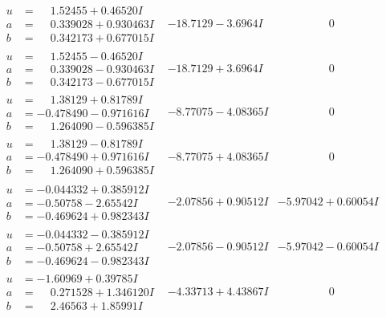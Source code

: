 \documentclass[1p]{elsarticle_modified}
\theoremstyle{definition}
\begin{document}
$$\begin{array}{c|c|c}
\begin{aligned}
u &= \phantom{-}1.52455 + 0.46520 I \\
a &= \phantom{-}0.339028 + 0.930463 I \\
b &= \phantom{-}0.342173 + 0.677015 I\end{aligned}
 & -18.7129 - 3.6964 I & \phantom{-0.000000 } 0 \\ \hline\begin{aligned}
u &= \phantom{-}1.52455 - 0.46520 I \\
a &= \phantom{-}0.339028 - 0.930463 I \\
b &= \phantom{-}0.342173 - 0.677015 I\end{aligned}
 & -18.7129 + 3.6964 I & \phantom{-0.000000 } 0 \\ \hline\begin{aligned}
u &= \phantom{-}1.38129 + 0.81789 I \\
a &= -0.478490 - 0.971616 I \\
b &= \phantom{-}1.264090 - 0.596385 I\end{aligned}
 & -8.77075 - 4.08365 I & \phantom{-0.000000 } 0 \\ \hline\begin{aligned}
u &= \phantom{-}1.38129 - 0.81789 I \\
a &= -0.478490 + 0.971616 I \\
b &= \phantom{-}1.264090 + 0.596385 I\end{aligned}
 & -8.77075 + 4.08365 I & \phantom{-0.000000 } 0 \\ \hline\begin{aligned}
u &= -0.044332 + 0.385912 I \\
a &= -0.50758 - 2.65542 I \\
b &= -0.469624 + 0.982343 I\end{aligned}
 & -2.07856 + 0.90512 I & -5.97042 + 0.60054 I \\ \hline\begin{aligned}
u &= -0.044332 - 0.385912 I \\
a &= -0.50758 + 2.65542 I \\
b &= -0.469624 - 0.982343 I\end{aligned}
 & -2.07856 - 0.90512 I & -5.97042 - 0.60054 I \\ \hline\begin{aligned}
u &= -1.60969 + 0.39785 I \\
a &= \phantom{-}0.271528 + 1.346120 I \\
b &= \phantom{-}2.46563 + 1.85991 I\end{aligned}
 & -4.33713 + 4.43867 I & \phantom{-0.000000 } 0 \\ \hline\begin{aligned}

\end{aligned}
\end{array}$$
\end{document}

